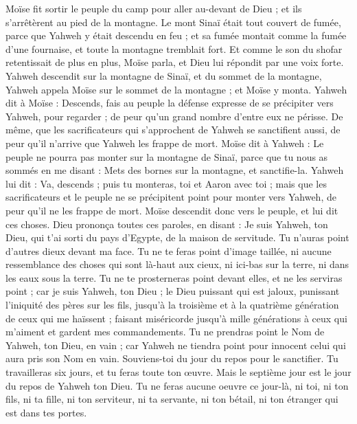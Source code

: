 \begin{multicols}{2}
Moïse fit sortir le peuple du camp pour aller au-devant de Dieu ; et ils s'arrêtèrent au pied de la montagne.
Le mont Sinaï était tout couvert de fumée, parce que Yahweh y était descendu en feu ; et sa fumée montait comme la fumée d'une fournaise, et toute la montagne tremblait fort.
Et comme le son du shofar retentissait de plus en plus, Moïse parla, et Dieu lui répondit par une voix forte.
Yahweh descendit sur la montagne de Sinaï, et du sommet de la montagne, Yahweh appela Moïse sur le sommet de la montagne ; et Moïse y monta.
Yahweh dit à Moïse : Descends, fais au peuple la défense expresse de se précipiter vers Yahweh, pour regarder ; de peur qu'un grand nombre d'entre eux ne périsse.
De même, que les sacrificateurs qui s'approchent de Yahweh se sanctifient aussi, de peur qu'il n'arrive que Yahweh les frappe de mort.
Moïse dit à Yahweh : Le peuple ne pourra pas monter sur la montagne de Sinaï, parce que tu nous as sommés en me disant : Mets des bornes sur la montagne, et sanctifie-la.
Yahweh lui dit : Va, descends ; puis tu monteras, toi et Aaron avec toi ; mais que les sacrificateurs et le peuple ne se précipitent point pour monter vers Yahweh, de peur qu’il ne les frappe de mort.
Moïse descendit donc vers le peuple, et lui dit ces choses.
\VerseOne{}Dieu prononça toutes ces paroles, en disant :
Je suis Yahweh, ton Dieu, qui t'ai sorti du pays d'Egypte, de la maison de servitude.
Tu n'auras point d'autres dieux devant ma face.
Tu ne te feras point d'image taillée, ni aucune ressemblance des choses qui sont là-haut aux cieux, ni ici-bas sur la terre, ni dans les eaux sous la terre.
Tu ne te prosterneras point devant elles, et ne les serviras point ; car je suis Yahweh, ton Dieu ; le Dieu puissant qui est jaloux, punissant l'iniquité des pères sur les fils, jusqu'à la troisième et à la quatrième génération de ceux qui me haïssent ;
faisant miséricorde jusqu’à mille générations à ceux qui m'aiment et gardent mes commandements.
Tu ne prendras point le Nom de Yahweh, ton Dieu, en vain ; car Yahweh ne tiendra point pour innocent celui qui aura pris son Nom en vain.
Souviens-toi du jour du repos pour le sanctifier.
Tu travailleras six jours, et tu feras toute ton œuvre.
Mais le septième jour est le jour du repos de Yahweh ton Dieu. Tu ne feras aucune oeuvre ce jour-là, ni toi, ni ton fils, ni ta fille, ni ton serviteur, ni ta servante, ni ton bétail, ni ton étranger qui est dans tes portes.

\end{multicols}
